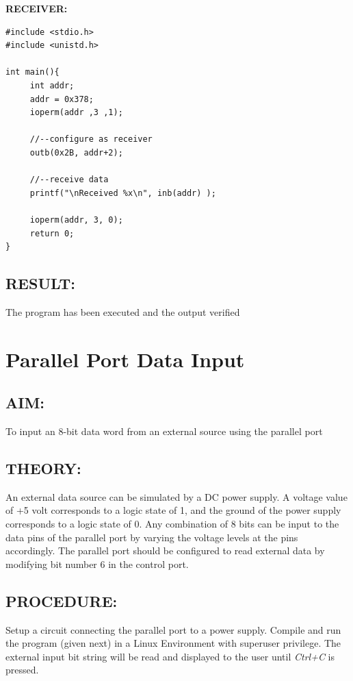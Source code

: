 \documentclass[a4paper,28pt]{report}
\begin{document}
\vspace{20pt}
\textbf{RECEIVER:}
\begin{lstlisting}
#include <stdio.h>
#include <unistd.h>

int main(){
     int addr;
     addr = 0x378;
     ioperm(addr ,3 ,1);
     
     //--configure as receiver
     outb(0x2B, addr+2);
     
     //--receive data
     printf("\nReceived %x\n", inb(addr) );
     
     ioperm(addr, 3, 0);
     return 0;
}
\end{lstlisting}

\section*{RESULT:}
The program has been executed and the output verified
%
%
%
%
\chapter{Parallel Port Data Input}
%
%
\section*{AIM:}
To input an 8-bit data word from an external source using the parallel port
\section*{THEORY:}
An external data source can be simulated by a DC power supply. A voltage value of +5 volt corresponds to a logic state of 1, and the ground of the power supply corresponds to a logic state of 0. Any combination of 8
bits can be input to the data pins of the parallel port by varying the voltage levels at the pins accordingly. The parallel port should be configured to read external data by modifying bit number 6 in the control port.
\section*{PROCEDURE:}
Setup a circuit connecting the parallel port to a power supply. Compile and run the program (given next) in a Linux Environment with superuser privilege. The external input bit string will be read and displayed to the user until \emph{Ctrl+C} is pressed.
\end{document}
